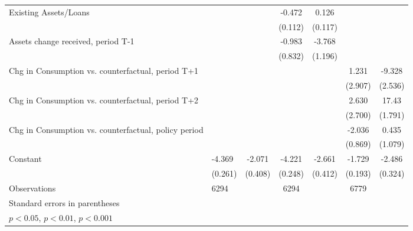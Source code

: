 \begin{table}[htbp]
\begin{tabular}{p{0.8in}l*{5}{c}}
Existing Assets/Loans&                     &                     &      -0.472\sym{***}&       0.126         &                     &                     \\
                    &                     &                     &     (0.112)         &     (0.117)         &                     &                     \\
Assets change received, period T-1&                     &                     &      -0.983         &      -3.768\sym{**} &                     &                     \\
                    &                     &                     &     (0.832)         &     (1.196)         &                     &                     \\
Chg in Consumption vs. counterfactual, period T+1&                     &                     &                     &                     &       1.231         &      -9.328\sym{***}\\
                    &                     &                     &                     &                     &     (2.907)         &     (2.536)         \\
Chg in Consumption vs. counterfactual, period T+2&                     &                     &                     &                     &       2.630         &       17.43\sym{***}\\
                    &                     &                     &                     &                     &     (2.700)         &     (1.791)         \\
Chg in Consumption vs. counterfactual, policy period&                     &                     &                     &                     &      -2.036\sym{*}  &       0.435         \\
                    &                     &                     &                     &                     &     (0.869)         &     (1.079)         \\
Constant            &      -4.369\sym{***}&      -2.071\sym{***}&      -4.221\sym{***}&      -2.661\sym{***}&      -1.729\sym{***}&      -2.486\sym{***}\\
                    &     (0.261)         &     (0.408)         &     (0.248)         &     (0.412)         &     (0.193)         &     (0.324)         \\
\hline
Observations        &        6294         &                     &        6294         &                     &        6779         &                     \\
\hline\hline
\multicolumn{7}{l}{\footnotesize Standard errors in parentheses}\\
\multicolumn{7}{l}{\footnotesize \sym{*} \(p<0.05\), \sym{**} \(p<0.01\), \sym{***} \(p<0.001\)}\\
\end{tabular}
\end{table}
